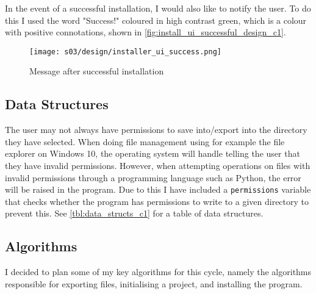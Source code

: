         In the event of a successful installation, I would also like to notify the user. 
        To do this I used the word "Success!" coloured in high contrast green, which is a colour with positive connotations, shown in \autoref{fig:install_ui_successful_design_c1}.

        \begin{figure}[!ht]
            \centering
            \texttt{[image: s03/design/installer\_ui\_success.png]}
            \caption{Message after successful installation}
            \label{fig:install_ui_successful_design_c1}
        \end{figure}


    \subsection{Data Structures}

        The user may not always have permissions to save into/export into the directory they have selected. 
        When doing file management using for example the file explorer on Windows 10, the operating system will handle telling the user that they have invalid permissions. 
        However, when attempting operations on files with invalid permissions through a programming language such as Python, the error will be raised in the program. 
        Due to this I have included a \verb|permissions| variable that checks whether the program has permissions to write to a given directory to prevent this. 
        See \autoref{tbl:data_structs_c1} for a table of data structures.

    \subsection{Algorithms}
        I decided to plan some of my key algorithms for this cycle, namely the algorithms responsible for exporting files, initialising a project, and installing the program.

